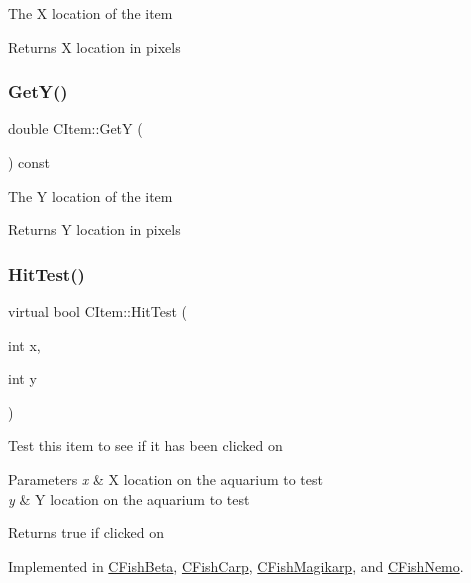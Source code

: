 The X location of the item \begin{DoxyReturn}{Returns}
X location in pixels 
\end{DoxyReturn}
\mbox{\label{class_c_item_ac0fe6be80f8ef19854d7f41b4803f658}} 
\subsubsection{\texorpdfstring{Get\+Y()}{GetY()}}
{\footnotesize\ttfamily double C\+Item\+::\+GetY (\begin{DoxyParamCaption}{ }\end{DoxyParamCaption}) const\hspace{0.3cm}{\ttfamily [inline]}}

The Y location of the item \begin{DoxyReturn}{Returns}
Y location in pixels 
\end{DoxyReturn}
\mbox{\label{class_c_item_a8bd4f5e3f2eb2487125dd435719484e8}} 
\subsubsection{\texorpdfstring{Hit\+Test()}{HitTest()}}
{\footnotesize\ttfamily virtual bool C\+Item\+::\+Hit\+Test (\begin{DoxyParamCaption}\item[{int}]{x,  }\item[{int}]{y }\end{DoxyParamCaption})\hspace{0.3cm}{\ttfamily [pure virtual]}}

Test this item to see if it has been clicked on 
\begin{DoxyParams}{Parameters}
{\em x} & X location on the aquarium to test \\
\hline
{\em y} & Y location on the aquarium to test \\
\hline
\end{DoxyParams}
\begin{DoxyReturn}{Returns}
true if clicked on 
\end{DoxyReturn}


Implemented in \hyperlink{class_c_fish_beta_a5bdd3d07a57ca1f01a7f2c5c00e0a662}{C\+Fish\+Beta}, \hyperlink{class_c_fish_carp_a8e5c6ea5402085533d7535d4524f7fd6}{C\+Fish\+Carp}, \hyperlink{class_c_fish_magikarp_ad23ff73aff08103618b8162dcaaf01b6}{C\+Fish\+Magikarp}, and \hyperlink{class_c_fish_nemo_a7ab85960d0a36a80cd6bf7fb78afe0ee}{C\+Fish\+Nemo}.

